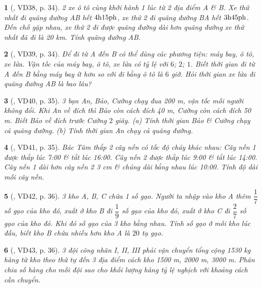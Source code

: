 \documentclass{article}
\newtheorem{baitoan}{}
\begin{document}
\begin{baitoan}[\cite{Binh_Toan_7_tap_1}, VD38, p. 34]
	2 xe ô tô cùng khởi hành 1 lúc từ 2 địa điểm A \& B. Xe thứ nhất đi quãng đường AB hết $\rm4h15ph$, xe thứ 2 đi quãng đường BA hết $\rm3h45ph$. Đến chỗ gặp nhau, xe thứ 2 đi được quãng đường dài hơn quãng đường xe thứ nhất đã đi là {\rm20 km}. Tính quãng đường AB.
\end{baitoan}

\begin{baitoan}[\cite{Binh_Toan_7_tap_1}, VD39, p. 34]
	Để đi từ A đến B có thể dùng các phương tiện: máy bay, ô tô, xe lửa. Vận tốc của máy bay, ô tô, xe lửa có tỷ lệ với $6$; $2$; $1$. Biết thời gian đi từ A đến B bằng máy bay ít hơn so với đi bằng ô tô là $6$ giờ. Hỏi thời gian xe lửa đi quãng đường AB là bao lâu?
\end{baitoan}

\begin{baitoan}[\cite{Binh_Toan_7_tap_1}, VD40, p. 35]
	3 bạn An, Bảo, Cường chạy đua {\rm200 m}, vận tốc mỗi người không đổi. Khi An về đích thì Bảo còn cách đích {\rm40 m}, Cường còn cách đích {\rm50 m}. Biết Bảo về đích trước Cường $2$ giây. (a) Tính thời gian Bảo \& Cường chạy cả quãng đường. (b) Tính thời gian An chạy cả quãng đường.
\end{baitoan}

\begin{baitoan}[\cite{Binh_Toan_7_tap_1}, VD41, p. 35]
	Bác Tâm thắp 2 cây nến có tốc độ cháy khác nhau: Cây nến 1 được thắp lúc {\rm7:00} \& tắt lúc {\rm16:00}. Cây nến 2 được thắp lúc {\rm9:00} \& tắt lúc {\rm14:00}. Cây nến 1 dài hơn cây nến 2 {\rm3 cm} \& chúng dài bằng nhau lúc {\rm10:00}. Tính độ dài mỗi cây nến.
\end{baitoan}

\begin{baitoan}[\cite{Binh_Toan_7_tap_1}, VD42, p. 36]
	3 kho A, B, C chứa 1 số gạo. Người ta nhập vào kho A thêm $\dfrac{1}{7}$ số gạo của kho đó, xuất ở kho B đi $\dfrac{1}{9}$ số gạo của kho đó, xuất ở kho C đi $\dfrac{2}{7}$ số gạo của kho đó. Khi đó số gạo của 3 kho bằng nhau. Tính số gạo ở mỗi kho lúc đầu, biết kho B chứa nhiều hơn kho A là $20$ tạ gạo.
\end{baitoan}

\begin{baitoan}[\cite{Binh_Toan_7_tap_1}, VD43, p. 36]
	3 đội công nhân I, II, III phải vận chuyển tổng cộng {\rm1530 kg} hàng từ kho theo thứ tự đến 3 địa điểm cách kho {\rm1500 m, 2000 m, 3000 m}. Phân chia số hàng cho mỗi đội sao cho khối lượng hàng tỷ lệ nghịch với khoảng cách cần chuyển.
\end{baitoan}
\end{document}
